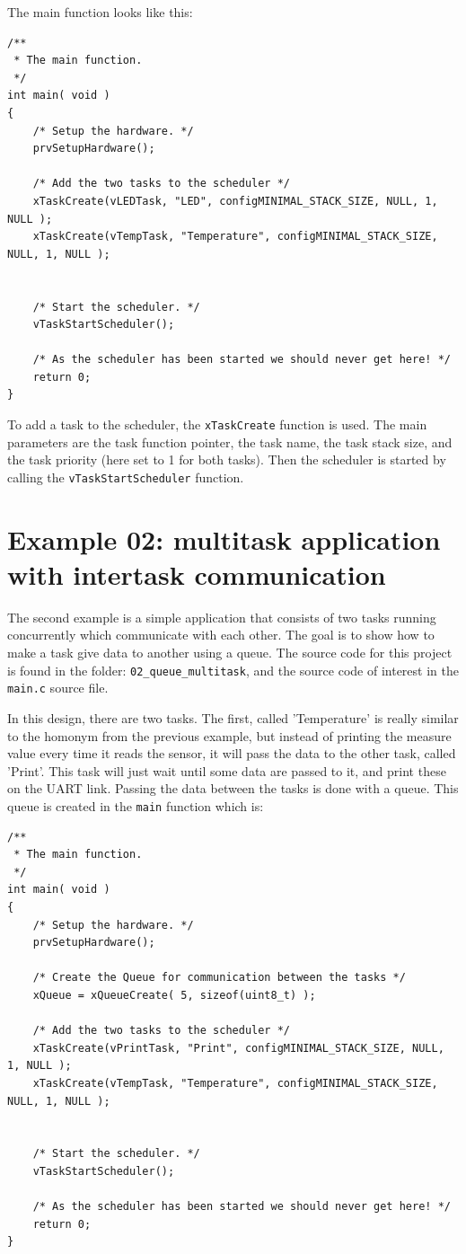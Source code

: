 \documentclass[11pt]{report}
\begin{document}
The main function looks like this:
\begin{verbatim}
/**
 * The main function.
 */
int main( void )
{
    /* Setup the hardware. */
    prvSetupHardware();

    /* Add the two tasks to the scheduler */
    xTaskCreate(vLEDTask, "LED", configMINIMAL_STACK_SIZE, NULL, 1, NULL );
    xTaskCreate(vTempTask, "Temperature", configMINIMAL_STACK_SIZE, NULL, 1, NULL );


    /* Start the scheduler. */
    vTaskStartScheduler();

    /* As the scheduler has been started we should never get here! */
    return 0;
}
\end{verbatim}

To add a task to the scheduler, the \verb$xTaskCreate$ function is used. The main parameters are the task function pointer, the task name, the task stack size, and the task priority (here set to 1 for both tasks). Then the scheduler is started by calling the \verb$vTaskStartScheduler$ function.


\section{Example 02: multitask application with intertask communication}

The second example is a simple application that consists of two tasks running concurrently which communicate with each other. The goal is to show how to make a task give data to another using a queue. The source code for this project is found in the folder: \verb$02_queue_multitask$, and the source code of interest in the \verb$main.c$ source file.

In this design, there are two tasks. The first, called 'Temperature' is really similar to the homonym from the previous example, but instead of printing the measure value every time it reads the sensor, it will pass the data to the other task, called 'Print'. This task will just wait until some data are passed to it, and print these on the UART link. Passing the data between the tasks is done with a queue. This queue is created in the \verb$main$ function which is:
\begin{verbatim}
/**
 * The main function.
 */
int main( void )
{
    /* Setup the hardware. */
    prvSetupHardware();

    /* Create the Queue for communication between the tasks */
    xQueue = xQueueCreate( 5, sizeof(uint8_t) );

    /* Add the two tasks to the scheduler */
    xTaskCreate(vPrintTask, "Print", configMINIMAL_STACK_SIZE, NULL, 1, NULL );
    xTaskCreate(vTempTask, "Temperature", configMINIMAL_STACK_SIZE, NULL, 1, NULL );


    /* Start the scheduler. */
    vTaskStartScheduler();

    /* As the scheduler has been started we should never get here! */
    return 0;
}
\end{verbatim}
\end{document}
